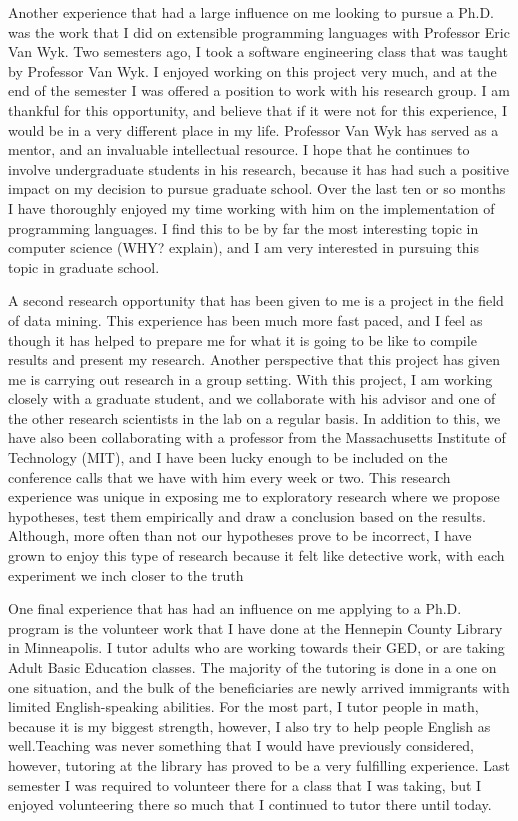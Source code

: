 \documentclass[a4paper,12pt]{article}
\newcommand{\tab}{\hspace*{2em}}
\begin{document}
\tab Another experience that had a large influence on me looking to pursue a Ph.D. was the work that I did on extensible programming languages with Professor Eric Van Wyk.  Two semesters ago, I took a software engineering class that was taught by Professor Van Wyk. I enjoyed working on this project very much, and at the end of the semester I was offered a position to work with his research group. I am thankful for this opportunity, and believe that if it were not for this experience, I would be in a very different place in my life. Professor Van Wyk has served as a mentor, and an invaluable intellectual resource. I hope that he continues to involve undergraduate students in his research, because it has had such a positive impact on my decision to pursue graduate school. Over the last ten or so months I have thoroughly enjoyed my time working with him on the implementation of programming languages. I find this to be by far the most interesting topic in computer science (WHY? explain), and I am very interested in pursuing this topic in graduate school.\newline

\tab A second research opportunity that has been given to me is a project in the field of data mining.  This experience has been much more fast paced, and I feel as though it has helped to prepare me for what it is going to be like to compile results and present my research.  Another perspective that this project has given me is carrying out research in a group setting.  With this project, I am working closely with a graduate student, and we collaborate with his advisor and one of the other research scientists in the lab on a regular basis.  In addition to this, we have also been collaborating with a professor from the Massachusetts Institute of Technology (MIT), and I have been lucky enough to be included on the conference calls that we have with him every week or two. This research experience was unique in exposing me to exploratory research where we propose hypotheses, test them empirically and draw a conclusion based on the results. Although, more often than not our hypotheses prove to be incorrect, I have grown to enjoy this type of research because it felt like detective work, with each experiment we inch closer to the truth\newline

\tab One final experience that has had an influence on me applying to a Ph.D. program is the volunteer work that I have done at the Hennepin County Library in Minneapolis. I tutor adults who are working towards their GED, or are taking Adult Basic Education classes.  The majority of the tutoring is done in a one on one situation, and the bulk of the beneficiaries are newly arrived immigrants with limited English-speaking abilities.  For the most part, I tutor people in math, because it is my biggest strength, however, I also try to help people English as well.Teaching was never something that I would have previously considered, however, tutoring at the library has proved to be a very fulfilling experience.  Last semester I was required to volunteer there for a class that I was taking, but I enjoyed volunteering there so much that I continued to tutor there until today.  \newline
\end{document}
